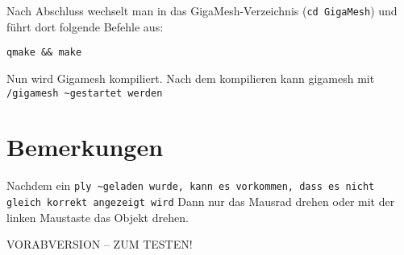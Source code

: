 \documentclass[%
a4paper,						%
12pt,							%
parskip=half*, 					%
headsepline,					%
headings=small,					%
]
{scrartcl}
\begin{document}
Nach Abschluss wechselt man in das GigaMesh-Verzeichnis (\texttt{cd GigaMesh}) und führt dort folgende Befehle aus:
\begin{lstlisting}
qmake && make
\end{lstlisting}
 
Nun wird Gigamesh kompiliert. Nach dem kompilieren kann gigamesh mit \verb ./gigamesh ~gestartet werden.
 
\section{Bemerkungen}
Nachdem ein \verb .ply ~geladen wurde, kann es vorkommen, dass es nicht gleich korrekt angezeigt wird. Dann nur das Mausrad drehen oder mit der linken Maustaste das Objekt drehen.

VORABVERSION -- ZUM TESTEN!
\end{document}

